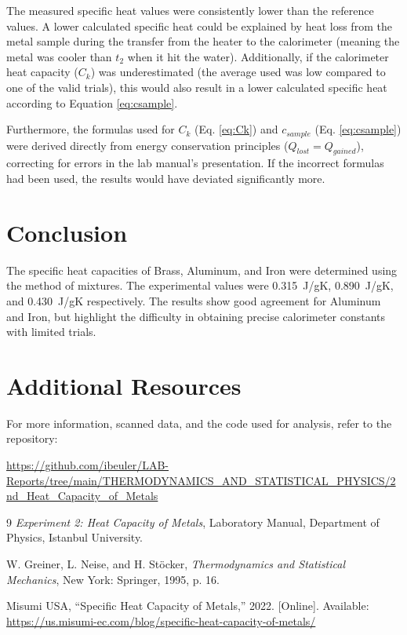 \documentclass[journal]{IEEEtran}
\begin{document}
The measured specific heat values were consistently lower than the reference values. A lower calculated specific heat could be explained by heat loss from the metal sample during the transfer from the heater to the calorimeter (meaning the metal was cooler than $t_2$ when it hit the water). Additionally, if the calorimeter heat capacity ($C_k$) was underestimated (the average used was low compared to one of the valid trials), this would also result in a lower calculated specific heat according to Equation \ref{eq:csample}.

Furthermore, the formulas used for $C_k$ (Eq. \ref{eq:Ck}) and $c_{sample}$ (Eq. \ref{eq:csample}) were derived directly from energy conservation principles ($Q_{lost} = Q_{gained}$), correcting for errors in the lab manual's presentation. If the incorrect formulas had been used, the results would have deviated significantly more.


\section{Conclusion}
The specific heat capacities of Brass, Aluminum, and Iron were determined using the method of mixtures. The experimental values were \SI{0.315}{J/gK}, \SI{0.890}{J/gK}, and \SI{0.430}{J/gK} respectively. The results show good agreement for Aluminum and Iron, but highlight the difficulty in obtaining precise calorimeter constants with limited trials.

\section{Additional Resources}
For more information, scanned data, and the code used for analysis, refer to the repository:

\vspace{0.5em}
\noindent
\url{https://github.com/ibeuler/LAB-Reports/tree/main/THERMODYNAMICS_AND_STATISTICAL_PHYSICS/2nd_Heat_Capacity_of_Metals}

\vspace{1em}
\begin{center}
\end{center}

\begin{thebibliography}{9}
    \emph{Experiment 2: Heat Capacity of Metals}, Laboratory Manual, Department of Physics, Istanbul University.
    
    W. Greiner, L. Neise, and H. Stöcker, \emph{Thermodynamics and Statistical Mechanics}, New York: Springer, 1995, p. 16.

    Misumi USA, ``Specific Heat Capacity of Metals,'' 2022. [Online]. Available: \url{https://us.misumi-ec.com/blog/specific-heat-capacity-of-metals/}
\end{thebibliography}
\end{document}
